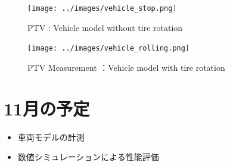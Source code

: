 \documentclass[twocolumn,a4j]{jsarticle}
\begin{document}
\begin{figure}[htbp]
	\centering
	\texttt{[image: ../images/vehicle\_stop.png]}
	\caption{PTV : Vehicle model without tire rotation}
	\baselineskip 4mm
	\texttt{[image: ../images/vehicle\_rolling.png]}
	\caption{PTV Measurement ：Vehicle model with tire rotation}
\end{figure}

\section{11月の予定}
\begin{itemize}
	\item 車両モデルの計測
	\item 数値シミュレーションによる性能評価
\end{itemize}
\end{document}
